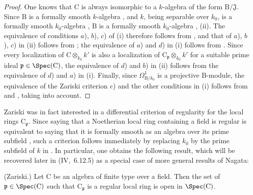 \begin{proof}
One knows that $\mathrm{C}$ is always isomorphic to a $k$-algebra of the form
$\mathrm{B}/\mathfrak{J}$. Since $\mathrm{B}$ is a formally smooth
$k$-algebra , and $k$, being separable over $k_0$, is a
formally smooth $k_0$-algebra , $\mathrm{B}$ is a formally
smooth $k_0$-algebra , (ii). The equivalence of conditions
$a$), $b$), $c$) of (i) therefore follows from , and that of
$a$), $b$), $c$) in (ii) follows from ; the equivalence of
$a$) and $d$) in (i) follows from . Since every localization
of $\mathrm{C}\otimes_{k_0}k'$ is also a localization of
$\mathrm{C}_\mathfrak{p}\otimes_{k_0}k'$ for a suitable prime ideal
$\mathfrak{p}\in\Spec(\mathrm{C})$, the equivalence of $d$) and $b$) in (ii)
follows from the equivalence of $d$) and $a$) in (i). Finally, since
$\Omega^1_{\mathrm{B}/k_0}$ is a projective $\mathrm{B}$-module, the
equivalence of the Zariski criterion $e$) and the other conditions in (i)
follows from  and , taking
 into account.
\end{proof}

Zariski was in fact interested in a differential criterion of regularity for
the local rings $\mathrm{C}_\mathfrak{p}$. Since saying that a Noetherian
local ring containing a field is regular is equivalent to saying that it is
formally smooth as an algebra over its prime subfield , such a
criterion follows immediately by replacing $k_0$ by the prime subfield of
$k$ in . In particular, one obtains the following result,
which will be recovered later in (IV,~6.12.5) as a special case of more
general results of Nagata:

\begin{corollary}[22.6.8]
\label{0.22.6.8}
\textnormal{(Zariski.)}
Let $\mathrm{C}$ be an algebra of finite type over a field.
Then the set of $\mathfrak{p}\in\Spec(\mathrm{C})$ such that $\mathrm{C}_\mathfrak{p}$ is a regular local ring is open in $\Spec(\mathrm{C})$.
\end{corollary}

